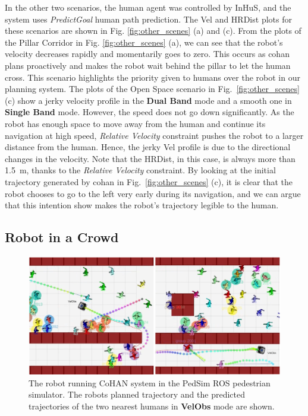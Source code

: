 In the other two scenarios, the human agent was controlled by InHuS, and the system uses \textit{PredictGoal} human path prediction. The Vel and HRDist plots for these scenarios are shown in Fig. \ref{fig:other_scenes} (a) and (c). From the plots of the Pillar Corridor in Fig. \ref{fig:other_scenes} (a), we can see that the robot's velocity decreases rapidly and momentarily goes to zero. This occurs as \acrshort{cohan} plans proactively and makes the robot wait behind the pillar to let the human cross. This scenario highlights the priority given to humans over the robot in our planning system. The plots of the Open Space scenario in Fig.~\ref{fig:other_scenes} (c) show a jerky velocity profile in the \textbf{Dual Band} mode and a smooth one in \textbf{Single Band} mode. However, the speed does not go down significantly. As the robot has enough space to move away from the human and continue its navigation at high speed, \textit{Relative Velocity} constraint pushes the robot to a larger distance from the human. Hence, the jerky Vel profile is due to the directional changes in the velocity. Note that the HRDist, in this case, is always more than \SI{1.5}{\metre}, thanks to the \textit{Relative Velocity} constraint. By looking at the initial trajectory generated by \acrshort{cohan} in Fig.~\ref{fig:other_scenes} (c), it is clear that the robot chooses to go to the left very early during its navigation, and we can argue that this intention show makes the robot's trajectory legible to the human.

\subsection{Robot in a Crowd}
\begin{figure}[h!]
    \centering
    \includegraphics[width=0.9\columnwidth]{images/chapter4/pedsim_new}
    \caption{The robot running CoHAN system in the PedSim ROS pedestrian simulator. The robots planned trajectory and the predicted trajectories of the two nearest humans in \textbf{VelObs} mode are shown.}
    \label{fig:pedsim_ros}
\end{figure}

